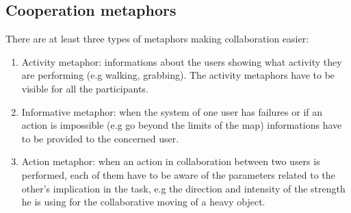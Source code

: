 \documentclass[a4paper]{article}
\begin{document}
\subsection{Cooperation metaphors}
There are at least three types of metaphors making collaboration easier:
\begin{enumerate}
	\item Activity metaphor: informations about the users showing what activity they are performing (e.g walking, grabbing). The activity metaphors have to be visible for all the participants.
	\item Informative metaphor: when the system of one user has failures or if an action is impossible (e.g go beyond the limits of the map) informations have to be provided to the concerned user.
	\item Action metaphor: when an action in collaboration between two users is performed, each of them have to be aware of the parameters related to the other's implication in the task, e.g the direction and intensity of the strength he is using for the collaborative moving of a heavy object.
\end{enumerate}
\end{document}
